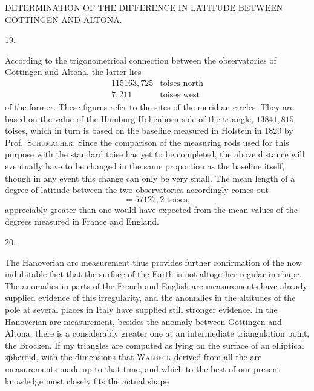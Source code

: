 \clearpage
\noindent{}\parbox[t]{\dimexpr\textwidth-10mm\relax}{\centering\scriptsize DETERMINATION OF THE DIFFERENCE IN LATITUDE BETWEEN GÖTTINGEN AND ALTONA.}\par
\begin{center}19.\end{center}
According to the trigonometrical connection between the observatories of Göttingen and Altona, the latter lies
\[
\begin{array}{rl}
115163{,}725&\text{toises north}\\
7{,}211&\text{toises west}
\end{array}
\]
of the former. These figures refer to the sites of the meridian circles. They are based on the value of the Hamburg-Hohenhorn side of the triangle, $13841{,}815$ toises, which in turn is based on the baseline measured in Holstein in 1820 by Prof.\ \textsc{Schumacher}. Since the comparison of the measuring rods used for this purpose with the standard toise has yet to be  completed, the above distance will eventually have to be changed in the same proportion as the baseline itself, though in any event this change can only be very small. The mean length of a degree of latitude between the two observatories accordingly comes out
\[
=57127{,}2\text{ toises},
\]
appreciably greater than one would have expected from the mean values of the degrees measured in France and England.
\begin{center}20.\end{center}
The Hanoverian arc measurement thus provides further confirmation of the now indubitable fact that the surface of the Earth is not altogether regular in shape. The anomalies in parts of the French and English arc measurements have already supplied evidence of this irregularity, and the anomalies in the altitudes of the pole at several places in Italy have supplied still stronger evidence. In the Hanoverian arc measurement, besides the anomaly between Göttingen and Altona, there is a considerably greater one at an intermediate triangulation point, the Brocken. If my triangles are computed as lying on the surface of an elliptical spheroid, with the dimensions that \textsc{Walbeck} derived from all the arc measurements made up to that time, and which to the best of our present knowledge most closely fits the actual shape

